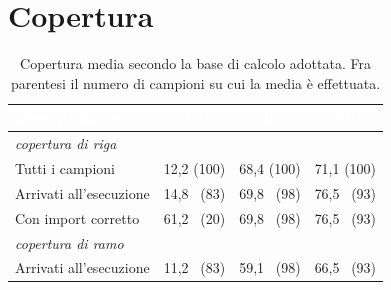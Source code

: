\section{Copertura}
\label{sec:ris-copertura}
%
%
%
%
%
%


\begin{table}[H]
\centering
\caption{Copertura media secondo la base di calcolo adottata. Fra parentesi il
numero di campioni su cui la media è effettuata.}
\label{tab:copertura}
\begin{tabular}{lccc}
\hline
\rowcolor{intest}
\textcolor{white}{\textbf{Base di calcolo}} & \textcolor{white}{\textbf{1B}} &
\textcolor{white}{\textbf{3B}} & \textcolor{white}{\textbf{8B}} \\
\hline
\multicolumn{4}{l}{\emph{copertura di riga}} \\
Tutti i campioni                & 12,2 (100) & 68,4 (100) & 71,1 (100) \\
Arrivati all'esecuzione         & 14,8 \ (83) & 69,8 \ (98) & 76,5 \ (93) \\
\rowcolor{accento}
Con import corretto             & 61,2 \ (20) & 69,8 \ (98) & 76,5 \ (93) \\
\hline
\multicolumn{4}{l}{\emph{copertura di ramo}} \\
Arrivati all'esecuzione         & 11,2 \ (83) & 59,1 \ (98) & 66,5 \ (93) \\
\hline
\end{tabular}
\end{table}


